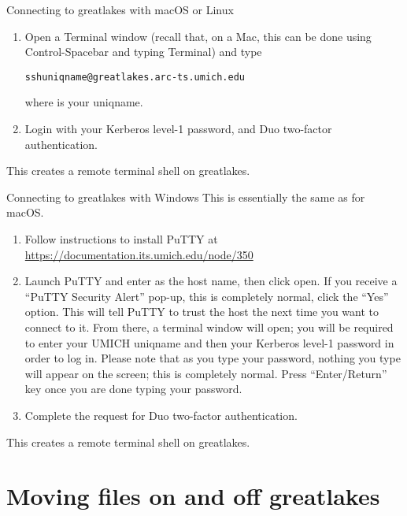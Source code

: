 \begin{frame}{Connecting to greatlakes with macOS or Linux}
  \begin{enumerate}
  \item Open a Terminal window (recall that, on a Mac, this can be done using Control-Spacebar and typing Terminal) and type
\begin{knitrout}\small
{}\color{fgcolor}\begin{kframe}
\begin{alltt}
ssh uniqname@greatlakes.arc-ts.umich.edu
\end{alltt}
\end{kframe}
\end{knitrout}
where  is your uniqname.
\item Login with your Kerberos level-1 password, and Duo two-factor authentication.
  \end{enumerate}
This creates a remote terminal shell on greatlakes.

\end{frame}



\begin{frame}{Connecting to greatlakes with Windows}
This is essentially the same as for macOS.
  \begin{enumerate}
  \item Follow instructions to install PuTTY at \url{https://documentation.its.umich.edu/node/350}
  \item Launch PuTTY and enter  as the host name, then click open.
If you receive a ``PuTTY Security Alert'' pop-up, this is completely normal, click the ``Yes'' option. This will tell PuTTY to trust the host the next time you want to connect to it. From there, a terminal window will open; you will be required to enter your UMICH uniqname and then your Kerberos level-1 password in order to log in. Please note that as you type your password, nothing you type will appear on the screen; this is completely normal. Press ``Enter/Return'' key once you are done typing your password.
\item Complete the request for Duo two-factor authentication.
  \end{enumerate}
This creates a remote terminal shell on greatlakes.

\end{frame}


\section{Moving files on and off greatlakes}

